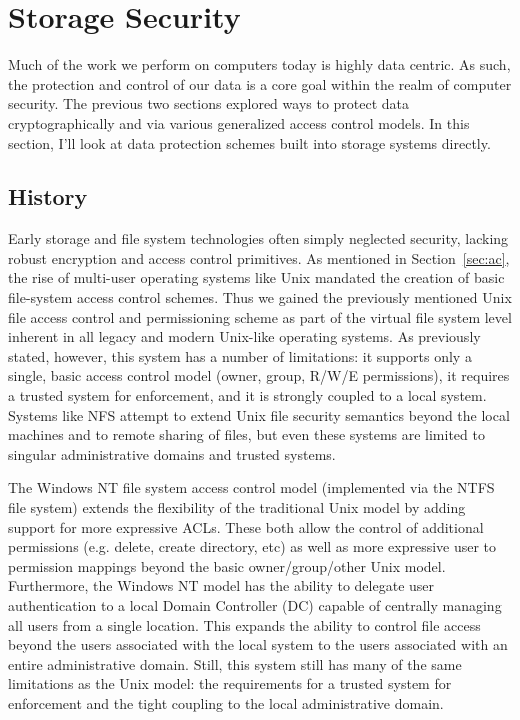 \documentclass{sig-alternate}
\begin{document}
\section{Storage Security}
\label{sec:fs}

Much of the work we perform on computers today is highly data
centric. As such, the protection and control of our data is a core
goal within the realm of computer security. The previous two sections
explored ways to protect data cryptographically and via various
generalized access control models. In this section, I'll look at data
protection schemes built into storage systems directly.

\subsection{History}

Early storage and file system technologies often simply neglected
security, lacking robust encryption and access control primitives. As
mentioned in Section~\ref{sec:ac}, the rise of multi-user operating
systems like Unix mandated the creation of basic file-system access
control schemes. Thus we gained the previously mentioned Unix file
access control and permissioning scheme as part of the virtual file
system level inherent in all legacy and modern Unix-like operating
systems. As previously stated, however, this system has a number of
limitations: it supports only a single, basic access control model
(owner, group, R/W/E permissions), it requires a trusted system for
enforcement, and it is strongly coupled to a local system. Systems
like NFS attempt to extend Unix file security semantics beyond the
local machines and to remote sharing of files, but even these systems
are limited to singular administrative domains and trusted systems.

The Windows NT file system access control model (implemented via the
NTFS file system) extends the flexibility of the traditional Unix
model by adding support for more expressive ACLs. These both allow the
control of additional permissions (e.g. delete, create directory, etc)
as well as more expressive user to permission mappings beyond the
basic owner/group/other Unix model. Furthermore, the Windows NT model
has the ability to delegate user authentication to a local Domain
Controller (DC) capable of centrally managing all users from a single
location. This expands the ability to control file access beyond the
users associated with the local system to the users associated with an
entire administrative domain. Still, this system still has many of the
same limitations as the Unix model: the requirements for a trusted
system for enforcement and the tight coupling to the local
administrative domain.
\end{document}
